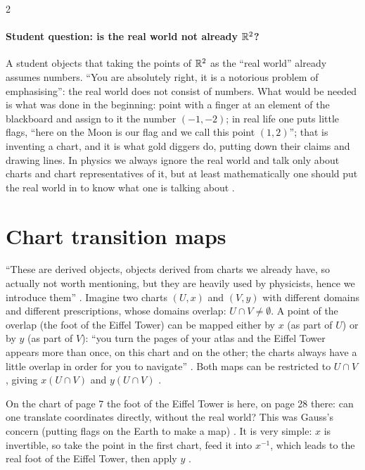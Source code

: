 \begin{paracol}{2}
\paragraph{Student question: is the real world not already $\mathbb{R}^2$?} A student objects that taking the points of $\mathbb{R}^2$ as the ``real world'' already assumes numbers. ``You are absolutely right, it is a notorious problem of emphasising'': the real world does not
consist of numbers. What would be needed is what was done in the beginning: point with a finger at an element of the blackboard and assign to it the number $(-1,-2)$; in real life one puts little flags, ``here on the Moon is our flag and we call this point $(1,2)$'';
that is inventing a chart, and it is what gold diggers do, putting down their claims and drawing lines. In physics we always ignore the real world and talk only about charts and chart representatives of it, but at least mathematically one should put the real world in to know what one is talking about
.

\section{Chart transition maps}\label{sec:c02-transition}

``These are derived objects, objects derived from charts we already have, so actually not worth mentioning, but they are heavily used by physicists, hence we introduce them'' .
Imagine two charts $(U,x)$ and $(V,y)$ with different domains and different prescriptions, whose domains overlap: $U\cap V\neq\emptyset$. A point of the overlap (the foot of the Eiffel Tower) can be mapped either by $x$ (as part of $U$)
or by $y$ (as part of $V$): ``you turn the pages of your atlas and the Eiffel Tower appears more than once, on this chart and on the other; the charts always have a little overlap in order for you to navigate'' .
Both maps can be restricted to $U\cap V$, giving $x(U\cap V)$ and $y(U\cap V)$ .

On the chart of page 7 the foot of the Eiffel Tower is here, on page 28 there: can one translate coordinates directly, without the real world? This was Gauss's concern (putting flags on the Earth to make a map)
. It is very simple: $x$ is invertible, so take the point in the first chart, feed it into $x^{-1}$, which leads to the real foot of the Eiffel Tower, then apply $y$ .


\end{paracol}

